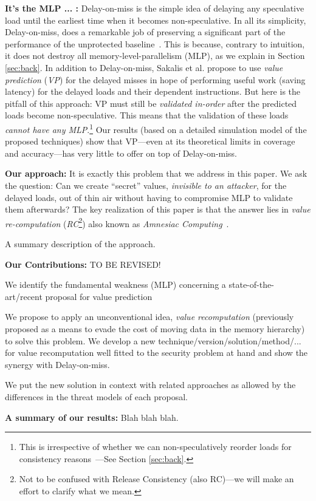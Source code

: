 \noindent \textbf{It's the MLP ... :} Delay-on-miss is the simple idea of delaying any speculative load until the earliest time when it becomes non-speculative. In all its simplicity, Delay-on-miss, does a remarkable job of preserving a significant part of the performance of the unprotected baseline~\cite{sakalis2019efficient}. This is because, contrary to intuition, it does not destroy all memory-level-parallelism (MLP), as we explain in Section \ref{sec:back}.
In addition to Delay-on-miss, Sakalis et al. propose to use \emph{value prediction} (\emph{VP}) for the delayed misses in hope of performing useful work (saving latency) for the delayed loads and their dependent instructions. But here is the pitfall of this approach: VP must still be \emph{validated in-order} after the predicted loads become non-speculative. This means that the validation of these loads \emph{cannot have any MLP}.\footnote{This is irrespective of whether we can non-speculatively reorder loads for consistency reasons~\cite{aros-isca17}---See Section \ref{sec:back}.} {\color{red} Our results (based on a detailed simulation model of the proposed techniques) show that VP---even at its theoretical limits in coverage and accuracy---has very little to offer on top of Delay-on-miss.}

\noindent \textbf{Our approach:} It is exactly this problem that we address in this paper. We ask the question: Can we create ``secret'' values, \emph{invisible to an attacker}, for the delayed loads, out of thin air without having to compromise MLP to validate them afterwards? The key realization of this paper is that the answer lies in \emph{value re-computation} (\emph{RC}\footnote{Not to be confused with Release Consistency (also RC)---we will make an effort to clarify what we mean.}) also known as \emph{Amnesiac Computing}~\cite{}.

A summary description of the approach.

\noindent \textbf{Our Contributions:} {\color{red} TO BE REVISED!}
\squishlist
\item We identify the fundamental weakness (MLP) concerning a state-of-the-art/recent proposal for value prediction 
\item We propose to apply an unconventional idea, \emph{value recomputation} (previously proposed as a means to evade the cost of moving data in the memory hierarchy) to solve this problem. We develop a new technique/version/solution/method/... for value recomputation well fitted to the security problem at hand and show the synergy with Delay-on-miss.
\item We put the new solution in context with related approaches as allowed by the differences in the threat models of each proposal.
\squishend

\noindent \textbf{A summary of our results:} Blah blah blah.






